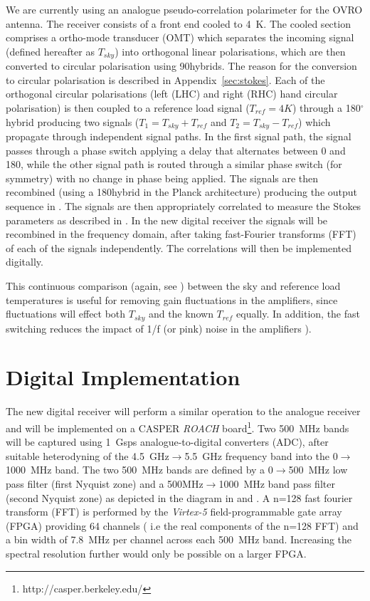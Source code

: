 We are currently using an analogue pseudo-correlation polarimeter for the OVRO antenna. The receiver consists of a front end cooled to 4~K. The cooled section comprises a ortho-mode transducer (OMT) which separates the incoming signal (defined hereafter as $T_{sky}$) into orthogonal linear polarisations, which are then converted to circular polarisation using 90\degt hybrids. The reason for the conversion to circular polarisation is described in Appendix~\ref{sec:stokes}. Each of the orthogonal circular polarisations (left (LHC) and right (RHC) hand circular polarisation) is then coupled to a reference load signal ($T_{ref}=4K$) through a 180$^{\circ}$ hybrid producing two signals ($T_{1}=T_{sky}+T_{ref}$ and $T_{2}=T_{sky}-T_{ref}$) which propagate through independent signal paths. In the first signal path, the signal passes through a phase switch applying a delay that alternates between 0 and 180\degt, while the other signal path is routed through a similar phase switch (for symmetry) with no change in phase being applied. The signals are then recombined (using a 180\degt hybrid in the Planck architecture) producing the output sequence in . The signals are then appropriately correlated to measure the Stokes parameters as described in . In the new digital receiver the signals will be recombined in the frequency domain, after taking fast-Fourier transforms (FFT) of each of the signals independently. The correlations will then be implemented digitally.

This continuous comparison (again, see ) between the sky and reference load temperatures is useful for removing gain fluctuations in the amplifiers, since fluctuations will effect both  $T_{sky}$ and the known $T_{ref}$ equally. In addition, the fast switching reduces the impact of 1/f (or pink) noise in the amplifiers \cite{Seiffert2002}). 



\section{Digital Implementation}
\label{sec:digitalImplementation}
The new digital receiver will perform a similar operation to the analogue receiver and will be implemented on a CASPER \textit{ROACH} board\footnote{http://casper.berkeley.edu/}. Two 500~MHz bands will be captured using 1~Gsps analogue-to-digital converters (ADC), after suitable heterodyning of the 4.5~GHz$\rightarrow$5.5~GHz frequency band into the 0$\rightarrow$1000~MHz band. The two 500~MHz bands are defined by a 0$\rightarrow$500~MHz low pass filter (first Nyquist zone) and a 500MHz$\rightarrow$1000~MHz band pass filter (second Nyquist zone) as depicted in the diagram in  and . A n=128 fast fourier transform (FFT) is performed by the \textit{Virtex-5} field-programmable gate array (FPGA) providing 64 channels ( i.e the real components of the n=128 FFT)  and a bin width  of 7.8~MHz per channel across each 500~MHz band. Increasing the spectral resolution further would only be possible on a larger FPGA.

